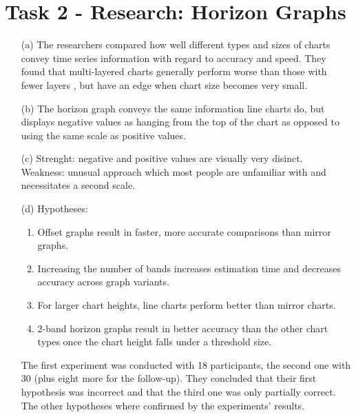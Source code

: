 \documentclass[a4paper]{article}
\begin{document}
\section*{Task 2 - Research: Horizon Graphs}

\begin{enumerate}
	\item[(a)] The researchers compared how well different types and sizes of charts convey time series information with regard to accuracy and speed. They found that multi-layered charts generally perform worse than those with fewer layers , but have an edge when chart size becomes very small.
	
	\item[(b)] The horizon graph conveys the same information line charts do, but displays negative values as hanging from the top of the chart as opposed to using the same scale as positive values.
	
	\item[(c)] Strenght: negative and positive values are visually very disinct. 
	\\Weakness: unusual approach which most people are unfamiliar with and necessitates a second scale.
	
	\item[(d)] Hypotheses: 
	\begin{enumerate}
		\item Offset graphs result in faster, more accurate comparisons than mirror graphs.
		\item Increasing the number of bands increases estimation time and decreases accuracy across graph variants.
		\item For larger chart heights, line charts perform better than mirror charts.
		\item 2-band horizon graphs result in better accuracy than the other chart types once the chart height falls under a threshold size.
	\end{enumerate}
The first experiment was conducted with 18 participants, the second one with 30 (plus eight more for the follow-up). They concluded that their first hypothesis was incorrect and that the third one was only partially correct. The other hypotheses where confirmed by the experiments' results.
	
\end{enumerate}
\end{document}
